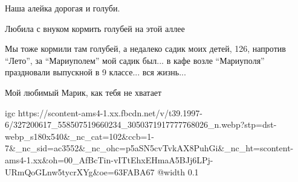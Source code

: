  
 
 
 
 

\qqSecCmt


Наша алейка дорогая и голуби.


Любила с внуком кормить голубей на этой аллее


Мы тоже кормили там голубей, а недалеко садик моих детей, 126, напротив \enquote{Лето},
за \enquote{Мариуполем} мой садик был... в кафе возле \enquote{Мариуполя} праздновали выпускной
в 9 классе... вся жизнь...


Мой любимый Марик, как тебя не хватает


\ifcmt
  igc https://scontent-ams4-1.xx.fbcdn.net/v/t39.1997-6/327200617_558507519660234_3050371917777768026_n.webp?stp=dst-webp_s180x540&_nc_cat=102&ccb=1-7&_nc_sid=ac3552&_nc_ohc=p5aSN5cvTvkAX8PuhGi&_nc_ht=scontent-ams4-1.xx&oh=00_AfBcTin-vITtEhxEHmaA5BJj6LPj-URmQoGLnw5tycrXYg&oe=63FABA67
	@width 0.1
\fi
